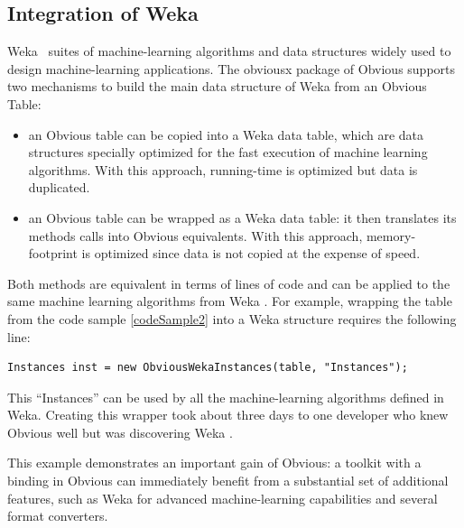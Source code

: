 \subsection{Integration of Weka }

Weka~\cite{Weka}  suites of
machine-learning algorithms and data structures widely used to design
machine-learning applications.  The obviousx package of Obvious
supports two mechanisms to build the main data structure of Weka  from an Obvious Table:
\begin{itemize}[noitemsep,topsep=0pt]
\item an Obvious table can be copied into a Weka  data
  table, which are data structures specially optimized for the fast
  execution of machine learning algorithms.  With this approach,
  running-time is optimized but data is duplicated.
\item an Obvious table can be wrapped as a Weka  data table: it then translates its methods calls into
  Obvious equivalents.  With this approach, memory-footprint is
  optimized since data is not copied at the expense of speed.
\end{itemize}

Both methods are equivalent in terms of lines of code and can be
applied to the same machine learning algorithms from Weka .  For example, wrapping the table from the code sample
\ref{codeSample2} into a Weka structure requires the following
line:

\begin{lstlisting}[caption={Wrapping an Obvious Table into Weka Instances},label=wekaExample]
Instances inst = new ObviousWekaInstances(table, "Instances");
\end{lstlisting}


This ``Instances'' can be used by all the machine-learning algorithms
defined in Weka.  Creating this wrapper took about three days to one
developer who knew Obvious well but was discovering Weka .

This example demonstrates an important gain of Obvious: a toolkit with
a binding in Obvious can immediately benefit from a substantial set of
additional features, such as Weka  for advanced
machine-learning capabilities and several format converters.


